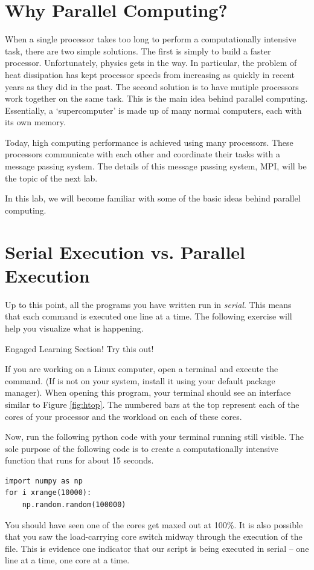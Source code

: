 \label{lab:parallel1}

\section*{Why Parallel Computing?}
When a single processor takes too long to perform a computationally intensive task, there are two simple solutions.
The first is simply to build a faster processor.
Unfortunately, physics gets in the way.
In particular, the problem of heat dissipation has kept processor speeds from increasing as quickly in recent years as they did in the past.
The second solution is to have mutiple processors work together on the same task.
This is the main idea behind parallel computing. Essentially, a `supercomputer' is made up of many normal computers, each with its own memory.

Today, high computing performance is achieved using many processors.
These processors communicate with each other and coordinate their tasks with a message passing system. The details of this message passing system, MPI, will be the topic of the next lab.

In this lab, we will become familiar with some of the basic ideas behind parallel computing.

\section*{Serial Execution vs. Parallel Execution}
Up to this point, all the programs you have written run in \emph{serial}. This means that each command is executed one line at a time. The following exercise will help you visualize what is happening.

\begin{info}
Engaged Learning Section! Try this out!

If you are working on a Linux computer, open a terminal and execute the  command. (If  is not on your system, install it using your default package manager). When opening this program, your terminal should see an interface similar to Figure \ref{fig:htop}. The numbered bars at the top represent each of the cores of your processor and the workload on each of these cores.

Now, run the following python code with your terminal running  still visible. The sole purpose of the following code is to create a computationally intensive function that runs for about 15 seconds.

\begin{lstlisting}
import numpy as np
for i xrange(10000):
    np.random.random(100000)
\end{lstlisting}

You should have seen one of the cores get maxed out at 100\%. It is also possible that you saw the load-carrying core switch midway through the execution of the file. This is evidence one indicator that our script is being executed in serial -- one line at a time, one core at a time.
\end{info}

